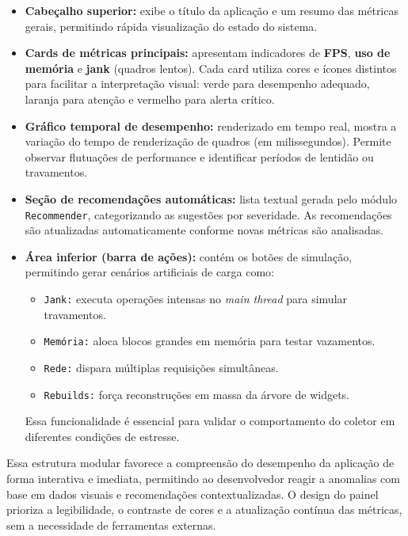 \documentclass[12pt,a4paper,oneside]{abntex2}
\begin{document}
\begin{itemize}
  \item \textbf{Cabeçalho superior:} exibe o título da aplicação e um resumo das métricas gerais, permitindo rápida visualização do estado do sistema.
  \item \textbf{Cards de métricas principais:} apresentam indicadores de \textbf{FPS}, \textbf{uso de memória} e \textbf{jank} (quadros lentos). Cada card utiliza cores e ícones distintos para facilitar a interpretação visual: verde para desempenho adequado, laranja para atenção e vermelho para alerta crítico.
  \item \textbf{Gráfico temporal de desempenho:} renderizado em tempo real, mostra a variação do tempo de renderização de quadros (em milissegundos). Permite observar flutuações de performance e identificar períodos de lentidão ou travamentos.
  \item \textbf{Seção de recomendações automáticas:} lista textual gerada pelo módulo \texttt{Recommender}, categorizando as sugestões por severidade. As recomendações são atualizadas automaticamente conforme novas métricas são analisadas.
  \item \textbf{Área inferior (barra de ações):} contém os botões de simulação, permitindo gerar cenários artificiais de carga como:
  \begin{itemize}
    \item \texttt{Jank:} executa operações intensas no \textit{main thread} para simular travamentos.
    \item \texttt{Memória:} aloca blocos grandes em memória para testar vazamentos.
    \item \texttt{Rede:} dispara múltiplas requisições simultâneas.
    \item \texttt{Rebuilds:} força reconstruções em massa da árvore de widgets.
  \end{itemize}
  Essa funcionalidade é essencial para validar o comportamento do coletor em diferentes condições de estresse.
\end{itemize}

\vspace{0.3cm}
Essa estrutura modular favorece a compreensão do desempenho da aplicação de forma interativa e imediata, permitindo ao desenvolvedor reagir a anomalias com base em dados visuais e recomendações contextualizadas. O design do painel prioriza a legibilidade, o contraste de cores e a atualização contínua das métricas, sem a necessidade de ferramentas externas.
\end{document}
